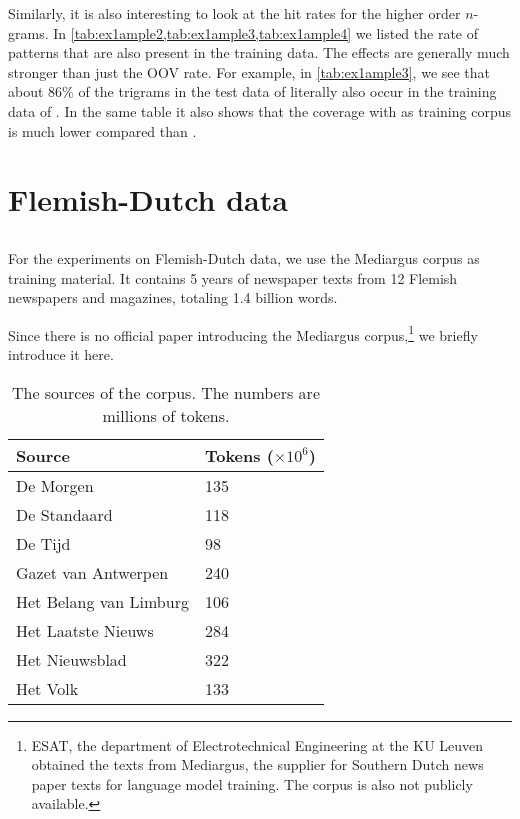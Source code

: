Similarly, it is also interesting to look at the hit rates for the higher order $n$-grams. In \cref{tab:ex1ample2,tab:ex1ample3,tab:ex1ample4} we listed the rate of patterns that are also present in the training data. The effects are generally much stronger than just the OOV rate. For example, in \cref{tab:ex1ample3}, we see that about 86\% of the trigrams in the test data of \obw literally also occur in the training data of \obw.
In the same table it also shows that the coverage with \emea as training corpus is much lower compared than \obw.
    
\section{Flemish-Dutch data}
\subsection{\mediargus}
For the experiments on Flemish-Dutch data, we use the Mediargus corpus as training material. It contains 5 years of newspaper texts from 12 Flemish newspapers and magazines, totaling 1.4 billion words.

Since there is no official paper introducing the Mediargus corpus,\footnote{ESAT, the department of Electrotechnical Engineering at the KU Leuven obtained the texts from Mediargus, the supplier for Southern Dutch news paper texts for language model training. The corpus is also not publicly available.} we briefly introduce it here.

\begin{table}
	\begin{tabular}{ll}
    	Source & \thead{Tokens \\ ($\times 10^6$)} \\ \hline
    	De Morgen & 135 \\
        De Standaard & 118 \\
        De Tijd & 98 \\
        Gazet van Antwerpen & 240 \\
        Het Belang van Limburg & 106 \\
        Het Laatste Nieuws & 284 \\
        Het Nieuwsblad & 322 \\
        Het Volk & 133
    \end{tabular}
    \caption{The sources of the \mediargus corpus. The numbers are millions of tokens.}
\end{table}

